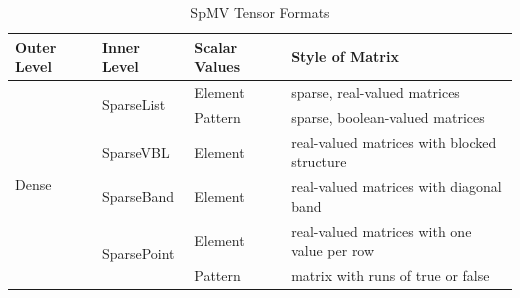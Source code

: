 \begin{table}[htbp]
    \scriptsize
    \centering
    \vspace{-12pt}
    \caption{SpMV Tensor Formats}
    \vspace{-12pt}
    \label{spmv_tensor_formats}
    \begin{tabular}{|l|l|l|l|}
        \hline
        \textbf{Outer Level} & \textbf{Inner Level} & \textbf{Scalar Values} & \textbf{Style of Matrix}\\
        \hline
        \multirow{6}{*}{Dense} & \multirow{2}{*}{SparseList} & Element & sparse, real-valued matrices \\
        \cline{3-4} 
        & & Pattern & sparse, boolean-valued matrices \\
        \cline{2-4} 
        & SparseVBL & Element & real-valued matrices with blocked structure \\
        \cline{2-4}
        & SparseBand & Element & real-valued matrices with diagonal band \\
        \cline{2-4}
        & \multirow{2}{*}{SparsePoint} & Element & real-valued matrices with one value per row \\
        \cline{3-4} 
        & & Pattern & matrix with runs of true or false \\
        \hline 
    \end{tabular}
    \vspace{-8pt}
\end{table}


